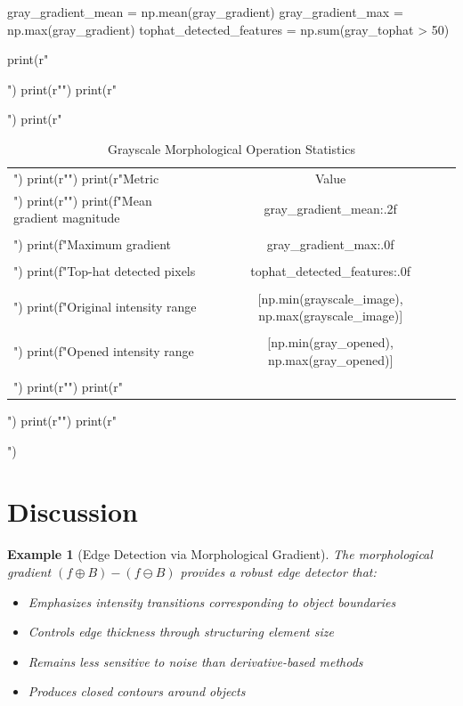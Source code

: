 \documentclass[a4paper, 11pt]{article}
\newtheorem{example}{Example}[section]
\begin{document}
\begin{pycode}
gray_gradient_mean = np.mean(gray_gradient)
gray_gradient_max = np.max(gray_gradient)
tophat_detected_features = np.sum(gray_tophat > 50)

print(r"\begin{table}[htbp]")
print(r"\centering")
print(r"\caption{Grayscale Morphological Operation Statistics}")
print(r"\begin{tabular}{lc}")
print(r"\toprule")
print(r"Metric & Value \\")
print(r"\midrule")
print(f"Mean gradient magnitude & {gray_gradient_mean:.2f} \\\\")
print(f"Maximum gradient & {gray_gradient_max:.0f} \\\\")
print(f"Top-hat detected pixels & {tophat_detected_features:.0f} \\\\")
print(f"Original intensity range & [{np.min(grayscale_image)}, {np.max(grayscale_image)}] \\\\")
print(f"Opened intensity range & [{np.min(gray_opened)}, {np.max(gray_opened)}] \\\\")
print(r"\bottomrule")
print(r"\end{tabular}")
print(r"\label{tab:grayscale}")
print(r"\end{table}")
\end{pycode}

\section{Discussion}

\begin{example}[Edge Detection via Morphological Gradient]
The morphological gradient $(f \oplus B) - (f \ominus B)$ provides a robust edge detector that:
\begin{itemize}
\item Emphasizes intensity transitions corresponding to object boundaries
\item Controls edge thickness through structuring element size
\item Remains less sensitive to noise than derivative-based methods
\item Produces closed contours around objects
\end{itemize}
\end{example}
\end{document}
